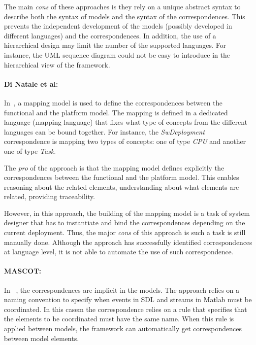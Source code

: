 The main \emph{cons} of these approaches is they rely on a unique abstract syntax to describe both  the syntax of models and the syntax of the correspondences. This prevents the independent development of the models (possibly developed in different languages) and the correspondences. In addition, the use of a hierarchical design may limit the number of the supported languages. For instance, the UML sequence diagram could not be easy to introduce in the hierarchical view of the framework.

\paragraph{Di Natale et al: }
In~\cite{dinatale}, a mapping model is used to define the correspondences between the functional and the platform model. The mapping is defined in a dedicated language (\ie mapping language) that fixes what type of concepts from the different languages can be bound together. For instance, the \emph{SwDeployment} correspondence is mapping two types of concepts: one of type \emph{CPU} and another one of type \emph{Task}. 

The \emph{pro} of the approach is that the mapping model defines explicitly the correspondences between the functional and the platform model. This enables reasoning about the related elements, \eg understanding about what elements are related, providing traceability.  

However, in this approach, the building of the mapping model is a task of system designer that has to instantiate and bind the correspondences depending on the current deployment. Thus, the major \emph{cons} of this approach is such a task is still manually done. Although the approach has successfully identified correspondences at language level, it is not able to automate the use of such correspondence.

\paragraph{MASCOT: }
In ~\cite{mascotbib}, the correspondences are implicit in the models. The approach relies on a naming convention to specify when events in SDL and streams in Matlab must be coordinated. In this casem the correspondence relies on a rule that specifies that the elements to be coordinated must have the same name. When this rule is applied between models, the framework can automatically get correspondences between model elements.


